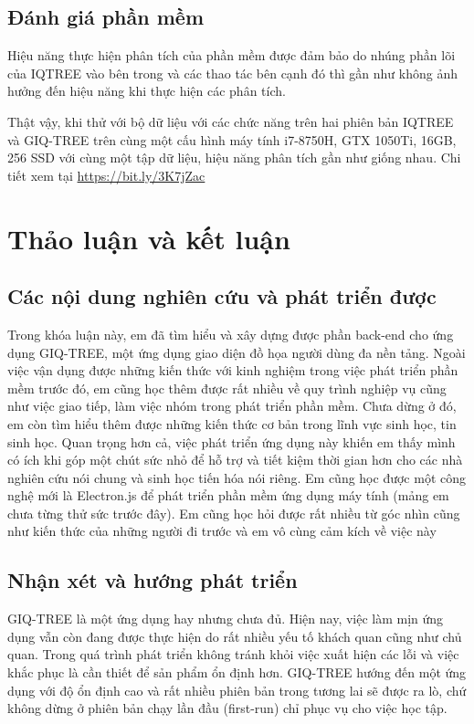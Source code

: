 \documentclass[12pt]{report}
\begin{document}
\section{Đánh giá phần mềm}
Hiệu năng thực hiện phân tích của phần mềm được đảm bảo do nhúng phần lõi của IQTREE vào bên trong và các thao tác bên cạnh đó thì gần như không ảnh hưởng đến hiệu năng khi thực hiện các phân tích.

Thật vậy, khi thử với bộ dữ liệu với các chức năng trên hai phiên bản IQTREE và GIQ-TREE trên cùng một cấu hình máy tính i7-8750H, GTX 1050Ti,  16GB, 256 SSD với cùng một tập dữ liệu, hiệu năng phân tích gần như giống nhau. Chi tiết xem tại \url{https://bit.ly/3K7jZac}

\newpage	
\chapter{Thảo luận và kết luận}
\label{chap:chapter6}

\section{Các nội dung nghiên cứu và phát triển được}
Trong khóa luận này, em đã tìm hiểu và xây dựng được phần back-end cho ứng dụng GIQ-TREE, một ứng dụng giao diện đồ họa người dùng đa nền tảng. Ngoài việc vận dụng được những kiến thức với kinh nghiệm trong việc phát triển phần mềm trước đó, em cũng học thêm được rất nhiều về quy trình nghiệp vụ cũng như việc giao tiếp, làm việc nhóm trong phát triển phần mềm. Chưa dừng ở đó, em còn tìm hiểu thêm được những kiến thức cơ bản trong lĩnh vực sinh học, tin sinh học. Quan trọng hơn cả, việc phát triển ứng dụng này khiến em thấy mình có ích khi góp một chút sức nhỏ để hỗ trợ và tiết kiệm thời gian hơn cho các nhà nghiên cứu nói chung và sinh học tiến hóa nói riêng. Em cũng học được một công nghệ mới là Electron.js để phát triển phần mềm ứng dụng máy tính (mảng em chưa từng thử sức trước đây). Em cũng học hỏi được rất nhiều từ góc nhìn cũng như kiến thức của những người đi trước và em vô cùng cảm kích về việc này

\newpage
\section{Nhận xét và hướng phát triển}
GIQ-TREE là một ứng dụng hay nhưng chưa đủ. Hiện nay, việc làm mịn ứng dụng vẫn còn đang được thực hiện do rất nhiều yếu tố khách quan cũng như chủ quan. Trong quá trình phát triển không tránh khỏi việc xuất hiện các lỗi và việc khắc phục là cần thiết để sản phẩm ổn định hơn. GIQ-TREE hướng đến một ứng dụng với độ ổn định cao và rất nhiều phiên bản trong tương lai sẽ được ra lò, chứ không dừng ở phiên bản chạy lần đầu (first-run) chỉ phục vụ cho việc học tập.
\end{document}
